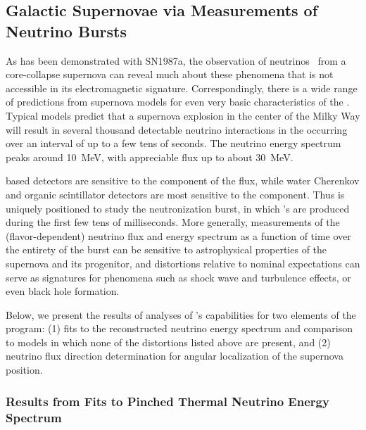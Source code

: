 \subsection{Galactic Supernovae via Measurements of Neutrino Bursts}
\label{sec:es:phys:galact}

As has been demonstrated with SN1987a, the observation 
of neutrinos~\cite{Bionta:1987qt,Hirata:1987hu} from a 
core-collapse supernova can reveal much about these  
phenomena that is not accessible in its  
electromagnetic signature.  Correspondingly, there is a 
wide range of predictions from supernova models for even 
very basic characteristics of the .  Typical  
models predict that a supernova explosion in the 
center of the Milky Way will result in several thousand 
detectable neutrino interactions in the   
occurring over an interval of up to a few tens of seconds.
The neutrino energy spectrum peaks around \SI{10}{\MeV}, 
with appreciable flux up to about \SI{30}{\MeV}.

\lar based detectors are sensitive to the \nue 
component of the flux, while water Cherenkov and organic 
scintillator detectors are most sensitive to the \anue 
component.  Thus  is uniquely %
positioned to study the 
neutronization burst, in which \nue's are produced during the 
first few tens of milliseconds.  More generally,  
measurements of the (flavor-dependent) neutrino flux and energy 
spectrum as a function of time over the entirety of the burst 
can be sensitive to astrophysical properties of the supernova 
and its progenitor, and distortions relative to nominal 
expectations can serve as signatures for phenomena such 
as shock wave and turbulence effects, or even black hole 
formation.  

Below, we present the results of analyses 
of 's capabilities for two elements of the  
 program: (1) fits to the reconstructed 
neutrino energy spectrum and comparison to models in which 
none of the distortions listed above are present, and (2) 
neutrino flux direction determination for angular localization 
of the supernova position.

\subsubsection{Results from Fits to Pinched Thermal Neutrino Energy Spectrum}

